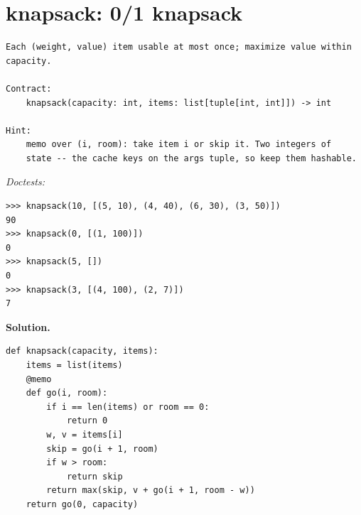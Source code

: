 \documentclass[11pt,letterpaper]{book}
\begin{document}
\section{knapsack: 0/1 knapsack}
\begin{lstlisting}[style=spec]
Each (weight, value) item usable at most once; maximize value within
capacity.

Contract:
    knapsack(capacity: int, items: list[tuple[int, int]]) -> int

Hint:
    memo over (i, room): take item i or skip it. Two integers of
    state -- the cache keys on the args tuple, so keep them hashable.
\end{lstlisting}
\noindent\textit{Doctests:}
\begin{lstlisting}[style=spec]
>>> knapsack(10, [(5, 10), (4, 40), (6, 30), (3, 50)])
90
>>> knapsack(0, [(1, 100)])
0
>>> knapsack(5, [])
0
>>> knapsack(3, [(4, 100), (2, 7)])
7
\end{lstlisting}
\noindent\textbf{Solution.}
\begin{lstlisting}[style=code]
def knapsack(capacity, items):
    items = list(items)
    @memo
    def go(i, room):
        if i == len(items) or room == 0:
            return 0
        w, v = items[i]
        skip = go(i + 1, room)
        if w > room:
            return skip
        return max(skip, v + go(i + 1, room - w))
    return go(0, capacity)
\end{lstlisting}
\end{document}
